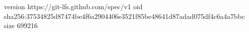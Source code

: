 version https://git-lfs.github.com/spec/v1
oid sha256:37534825d87474be4f6a2904406e3521f85be48641d87adad075df4c6a4a7bbc
size 699216
